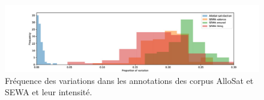 \begin{figure}[thb]
  \centering
    \includegraphics[width=18cm]{./Chapitre5/figures/variation.jpeg}
    \caption{Fréquence des variations dans les annotations des corpus AlloSat et SEWA et leur intensité.}
    \label{fig:variationAnnot}
\end{figure}
